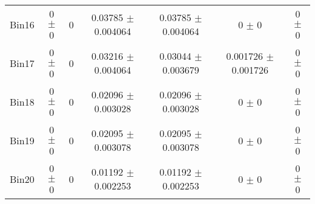 \begin{tabular}{@{\extracolsep{4pt}}lcccccc@{}}
     Bin16 & 0 $\pm$ 0 & 0 & 0.03785 $\pm$ 0.004064 & 0.03785 $\pm$ 0.004064 & 0 $\pm$ 0 & 0 $\pm$ 0 \\ 
     Bin17 & 0 $\pm$ 0 & 0 & 0.03216 $\pm$ 0.004064 & 0.03044 $\pm$ 0.003679 & 0.001726 $\pm$ 0.001726 & 0 $\pm$ 0 \\ 
     Bin18 & 0 $\pm$ 0 & 0 & 0.02096 $\pm$ 0.003028 & 0.02096 $\pm$ 0.003028 & 0 $\pm$ 0 & 0 $\pm$ 0 \\ 
     Bin19 & 0 $\pm$ 0 & 0 & 0.02095 $\pm$ 0.003078 & 0.02095 $\pm$ 0.003078 & 0 $\pm$ 0 & 0 $\pm$ 0 \\ 
     Bin20 & 0 $\pm$ 0 & 0 & 0.01192 $\pm$ 0.002253 & 0.01192 $\pm$ 0.002253 & 0 $\pm$ 0 & 0 $\pm$ 0 \\ 
\hline\hline
  \end{tabular}

